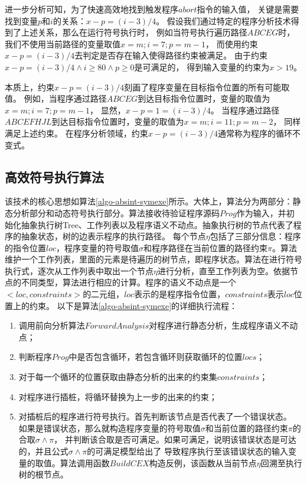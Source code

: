 进一步分析可知，为了快速高效地找到触发程序$abort$指令的输入值，
关键是需要找到变量$p$和$i$的关系：$x-p = (i-3)/4$。
假设我们通过特定的程序分析技术得到了上述关系，那么在运行符号执行时，
例如当符号执行遍历路径$ABCEG$时，我们不使用当前路径的变量取值$x=m;i=7;p=m-1$，
而使用约束$x-p = (i-3)/4$去判定是否存在输入使得路径约束被满足。
由于约束$x-p = (i-3)/4 \wedge i\geq 80 \wedge p \geq 0$是可满足的，
得到输入变量的约束为$x>19$。

本质上，约束$x-p = (i-3)/4$刻画了程序变量在目标指令位置的所有可能取值。
例如，当程序通过路径$ABCEG$到达目标指令位置时，变量的取值为$x=m;i=7;p=m-1$，
显然，$x-p = 1 = (i-3)/4$。
当程序通过路径$ABCEFHJL$到达目标指令位置时，变量的取值为$x=m;i=11;p=m-2$，
同样满足上述约束。
在程序分析领域，约束$x-p = (i-3)/4$通常称为程序的循环不变式。


\subsection{高效符号执行算法}

该技术的核心思想如算法\ref{algo-absint-symexe}所示。大体上，算法分为两部分：静态分析部分和动态符号执行部分。算法接收待验证程序源码$Prog$作为输入，并初始化抽象执行树Tree、工作列表以及程序语义不动点。抽象执行树的节点代表了程序的抽象状态，树的边表示程序的执行路径。
每个节点$\eta$包括了三部分信息：程序的指令位置$loc$，程序变量的符号取值$\sigma$和程序路径在当前位置的路径约束$\pi$。算法维护一个工作列表，里面的元素是待遍历的树节点，即程序状态。算法在进行符号执行式，逐次从工作列表中取出一个节点$\eta$进行分析，直至工作列表为空。依据节点的不同类型，算法进行相应的计算。程序的语义不动点是一个$<loc,constraints>$的二元组，$loc$表示的是程序指令位置，$constraints$表示$loc$位置上的约束。
以下是算法\ref{algo-absint-symexe}的详细执行流程：

\begin{enumerate}
\item 调用前向分析算法$ForwardAnalysis$对程序进行静态分析，生成程序语义不动点；

\item 判断程序$Prog$中是否包含循环，若包含循环则获取循环的位置$locs$；

\item 对于每一个循环的位置获取由静态分析的出来的约束集$constraints$；

\item 对程序进行插桩，将循环替换为上一步的出来的约束；

\item 对插桩后的程序进行符号执行。首先判断该节点是否代表了一个错误状态。
如果是错误状态，那么就构造程序变量的符号取值$\sigma$和当前位置的路径约束$\pi$的合取$\sigma \wedge \pi$，
并判断该合取是否可满足。如果可满足，说明该错误状态是可达的，并且公式$\sigma \wedge \pi$的可满足模型给出了
导致程序执行至该错误状态的输入变量的取值。算法调用函数$BuildCEX$构造反例，该函数从当前节点$\eta$回溯至执行树的根节点。
\end{enumerate}


